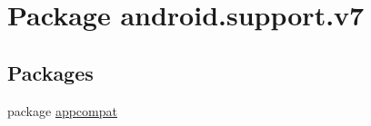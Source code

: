 \hypertarget{namespaceandroid_1_1support_1_1v7}{}\section{Package android.\+support.\+v7}
\label{namespaceandroid_1_1support_1_1v7}
\subsection*{Packages}
\begin{DoxyCompactItemize}
\item 
package \hyperlink{namespaceandroid_1_1support_1_1v7_1_1appcompat}{appcompat}
\end{DoxyCompactItemize}
